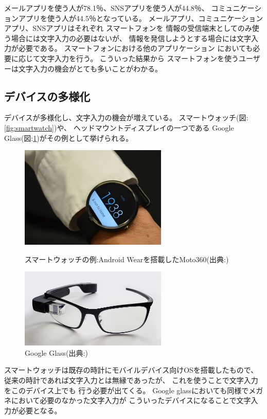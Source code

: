 メールアプリを使う人が78.1％、SNSアプリを使う人が44.8％、
コミュニケーションアプリを使う人が44.5％となっている。
メールアプリ、コミュニケーションアプリ、SNSアプリはそれぞれ
スマートフォンを
情報の受信端末としてのみ使う場合には文字入力の必要はないが、
情報を発信しようとする場合には文字入力が必要である。
スマートフォンにおける他のアプリケーション
においても必要に応じて文字入力を行う。
こういった結果から
スマートフォンを使うユーザーは文字入力の機会がとても多いことがわかる。

\subsection{デバイスの多様化}
デバイスが多様化し、文字入力の機会が増えている。
スマートウォッチ(図:\ref{fig:smartwatch})や、
ヘッドマウントディスプレイの一つである
Google Glass(図:\ref{fig:googleglass})がその例として挙げられる。
\begin{figure}[htbp]
  \begin{minipage}{0.5\hsize}
    \begin{center}
      \includegraphics[width=70mm,bb=0 0 246 171]{images/smartwatch.png}
    \end{center}
    \caption{スマートウォッチの例:Android Wearを搭載したMoto360(出典:\cite{smartwatch})}
    \label{fig:smartwatch}
  \end{minipage}
  \begin{minipage}{0.5\hsize}
    \begin{center}
      \includegraphics[width=70mm,bb=0 0 1280 697]{images/googleglass.png}
    \end{center}
    \caption{Google Glass(出典:\cite{googleglass})}
    \label{fig:googleglass}
  \end{minipage}
\end{figure}
スマートウォッチは既存の時計にモバイルデバイス向けOSを搭載したもので、
従来の時計であれば文字入力とは無縁であったが、
これを使うことで文字入力をこのデバイス上でも
行う必要が出てくる。
Google glassにおいても同様でメガネにおいて必要のなかった文字入力が
こういったデバイスになることで文字入力が必要となる。

